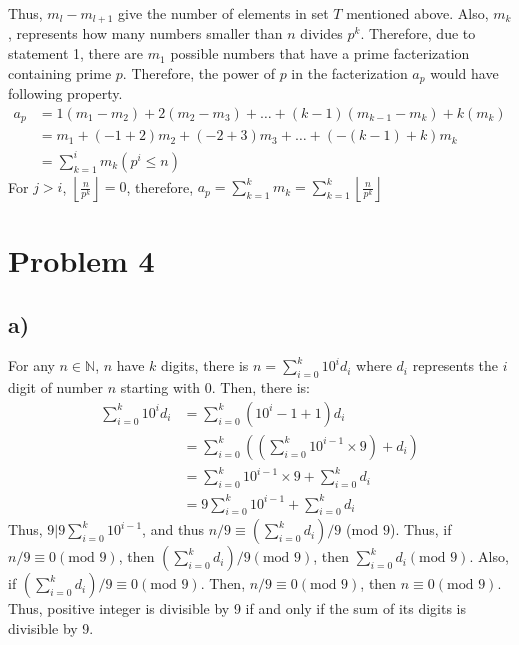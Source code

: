 \documentclass{article}
\begin{document}
Thus, \(m_l - m_{l+1}\) give the number of elements in set \(T\) mentioned above. Also, \(m_k\), represents how many numbers smaller than \(n\) 
divides \(p^k\). Therefore, due to statement 1, there are \(m_1\) possible numbers that have a prime facterization containing prime \(p\).
Therefore, the power of \(p\) in the facterization \(a_p\) would have following property.
\begin{align*}
    a_p&=1(m_1-m_2)+2(m_2-m_3)+\dots+(k-1)(m_{k-1}-m_k)+k(m_k)\\
        &=m_1+(-1+2)m_2+(-2+3)m_3+\dots+(-(k-1)+k)m_k\\
        &=\sum_{k=1}^i m_k (p^i\leqslant n)
\end{align*}
For \(j>i\), \(\left\lfloor \frac{n}{p^k}\right\rfloor = 0\), therefore, \(\displaystyle{a_p = \sum_{k=1}^k m_k=\sum^k_{k=1} \left\lfloor \frac{n}{p^k}\right\rfloor}\)
\newpage
\section*{Problem 4}
\subsection*{a)}
For any \(n\in\mathbb{N}\), \(n\) have \(k\) digits, there is \(\displaystyle{n=\sum^k_{i=0}10^id_i}\) where \(d_i\) represents the \(i\) digit of number \(n\) starting with 0.
Then, there is:
\begin{align*}
    \sum^k_{i=0}10^id_i&=\sum^k_{i=0} (10^i-1+1)d_i\\
                            &=\sum^k_{i=0} \left(\left(\sum^k_{i=0} 10^{i-1}\times 9\right)+d_i\right)\\
                            &=\sum^k_{i=0}10^{i-1}\times 9 + \sum^k_{i=0}d_i\\
                            &=9\sum^k_{i=0}10^{i-1} + \sum^k_{i=0}d_i
\end{align*}
Thus, \(9|9\sum^k_{i=0}10^{i-1}\), and thus \(n/9\equiv \left(\sum^k_{i=0}d_i\right)/9\) (mod \(9\)).
Thus, if \\ \(n/9\equiv 0 (\text{mod }9)\), then \(\left(\sum^k_{i=0}d_i\right)/9 (\text{mod }9)\), then \(\sum^k_{i=0}d_i (\text{mod }9)\). 
Also, if \(\left(\sum^k_{i=0}d_i\right)/9 \equiv 0 (\text{mod }9)\). Then, \(n/9\equiv 0 (\text{mod }9)\), then \(n\equiv 0 (\text{mod }9)\). 
Thus, positive integer is divisible by 9 if and only if the sum of its digits is divisible by 9.\newpage
\end{document}
